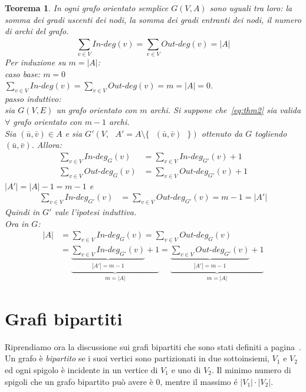 \documentclass[a4paper, openany]{book}
\theoremstyle{plain}
\newtheorem{thm}{Teorema}[section]
\theoremstyle{definition}
\begin{document}
\begin{thm}
In ogni grafo orientato semplice $G(V,A)$ sono uguali tra loro: la somma dei gradi
uscenti dei nodi, la somma dei gradi entranti dei nodi, il numero di archi del grafo.
\begin{equation}
{\sum_{v \in V}^{} In\text{-}deg(v)} = {\sum_{v \in V}^{} Out\text{-}deg(v)} = |A|
\label{eq:thm2}
\end{equation}
\proof
    Per induzione su $m = |A|$:\\
    \emph{caso base: $m = 0$}\\ 
    \indent $\sum_{v \in V}^{} In\text{-}deg(v) = \sum_{v \in V}^{} Out\text{-}deg(v) =
    m = |A| = 0$.\\
    \emph{passo induttivo:}\\
    \indent sia $G(V,E)$ un grafo orientato con $m$ archi. Si suppone che~\ref{eq:thm2} 
    sia valida $\forall$ grafo orientato con $m-1$ archi.\\
    Sia $(\bar{u}, \bar{v}) \in A$ e sia 
    $G'(V, \text{ } A'=A \setminus \{\text{ } (\bar{u}, \bar{v}) \text{ }\})$ 
    ottenuto da $G$ togliendo $(\bar{u}, \bar{v})$. Allora:
    \begin{align*}
        \sum_{v \in V}^{} {In\text{-}deg_{G}(v)} & = \sum_{v \in V}^{} {In\text{-}deg_{G'}(v)} + 1\\
        \sum_{v \in V}^{} Out\text{-}deg_{G}(v) & = \sum_{v \in V}^{} Out\text{-}deg_{G'}(v) + 1
    \end{align*}
    $|A'| = |A| - 1 = m - 1$ e\\ 
    \begin{align*}
        \sum_{v \in V}^{} {In\text{-}deg_{G'}(v)} & = \sum_{v \in V}^{} {Out\text{-}deg_{G'}(v)} = 
        m - 1 = |A'|
    \end{align*}
    Quindi in $G'$ vale l'ipotesi induttiva.\\Ora in $G$:
    \begin{equation*}
    \begin{split}
        |A| & = \sum_{v \in V}^{} {In\text{-}deg_{G}(v)} = \sum_{v \in V}^{} {Out\text{-}deg_{G}(v)}\\
    & =\underbrace{\underbrace{\sum_{v \in V}^{} {In\text{-}deg_{G'}(v)}}_{|A'| = m-1}+1}_{m=|A|} =
        \underbrace{\underbrace{\sum_{v \in V}^{} {Out\text{-}deg_{G'}(v)}}_{|A'| = m-1}+1}_{m=|A|}
    \end{split}
    \end{equation*}
\endproof
\end{thm}


\section{Grafi bipartiti}
Riprendiamo ora la discussione sui grafi bipartiti che sono stati definiti a pagina~\pageref{bip}.
Un grafo è \emph{bipartito} se i suoi vertici sono partizionati in due sottoinsiemi,
$V_1$ e $V_2$ ed ogni spigolo è incidente in un vertice di $V_1$ e uno di $V_2$.
Il minimo numero di spigoli che un grafo bipartito può avere è $0$, mentre il massimo é 
$|V_1|\cdot|V_2|$.
\end{document}
